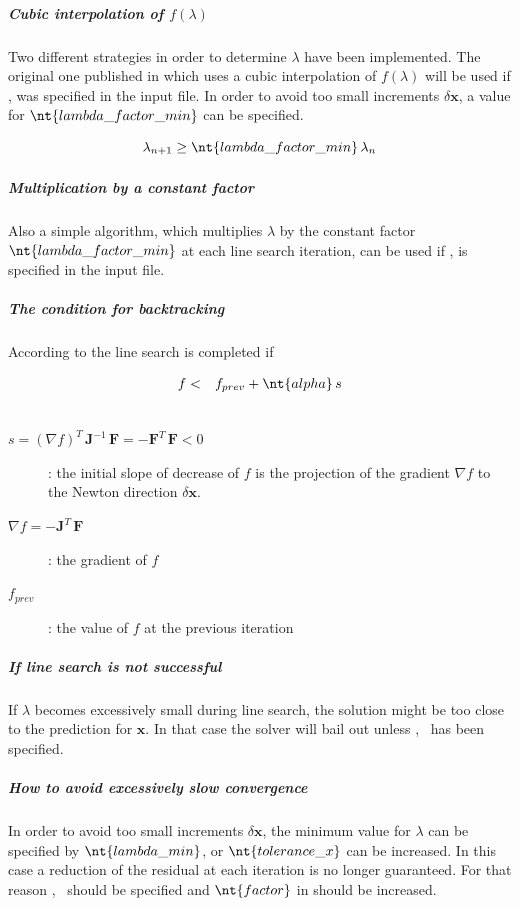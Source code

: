 \subparagraph{Cubic interpolation of $f\left(\lambda\right)$}
Two different strategies in order to determine $\lambda$ have been implemented.
The original one published in \cite{NUMERICAL-RECIPES-IN-C} which uses a cubic interpolation of $f\left(\lambda\right)$ will be used if ,  was specified in the input file.
In order to avoid too small increments $\delta\boldsymbol{x}$, a value for $\nt{lambda\_factor\_min}$ can be specified.

\begin{equation}
\lambda_{n+1} \geq \nt{lambda\_factor\_min} \, \lambda_{n}
\end{equation}

\subparagraph{Multiplication by a constant factor}
Also a simple algorithm, which multiplies $\lambda$ by the constant factor $\nt{lambda\_factor\_min}$ at each line search iteration, can be used if ,  is specified in the input file.

\subparagraph{The condition for backtracking}
According to \cite{NUMERICAL-RECIPES-IN-C} the line search is completed if

\begin{eqnarray}
f &<& f_{prev} + \nt{alpha} \, s \\ \nonumber
\end{eqnarray}

\begin{description}
\item[$s=\left(\nabla f\right)^T\,\boldsymbol{J}^{-1}\,\boldsymbol{F} = -\boldsymbol{F}^T\,\boldsymbol{F} < 0$]:
the initial slope of decrease of $f$ is the projection of the gradient $\nabla f$ to the Newton direction $\delta\boldsymbol{x}$.
\item[$\nabla f=-\boldsymbol{J}^T\,\boldsymbol{F}$]: the gradient of $f$
\item[$f_{prev}$]: the value of $f$ at the previous iteration
\end{description}

\subparagraph{If line search is not successful}
If $\lambda$ becomes excessively small during line search, the solution might be too close to the prediction for $\boldsymbol{x}$.
In that case the solver will bail out unless ,~ has been specified.

\subparagraph{How to avoid excessively slow convergence}
In order to avoid too small increments $\delta\boldsymbol{x}$, the minimum value for $\lambda$ can be specified by $\nt{lambda\_min}$, or $\nt{tolerance\_x}$ can be increased. In this case a reduction of the residual at each iteration is no longer guaranteed. For that reason ,~ should be specified and $\nt{factor}$ in  should be increased.

